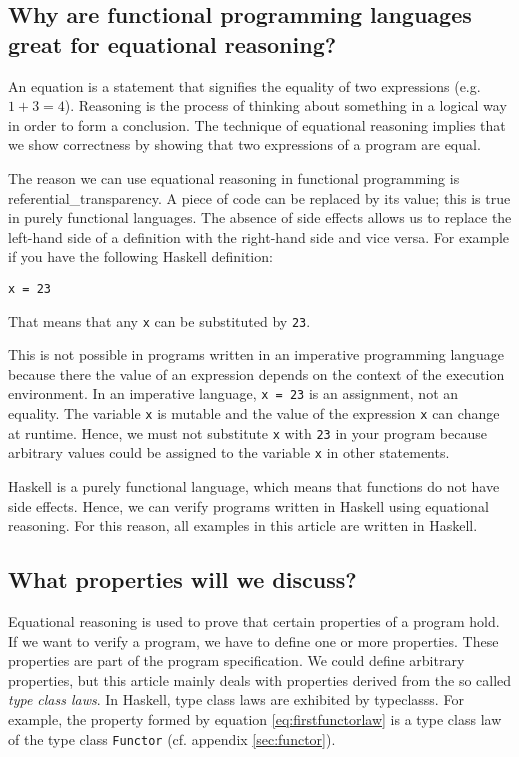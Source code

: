 \subsection{Why are functional programming languages great for equational reasoning?}

An equation is a statement that signifies the equality of two expressions (e.g. $1 + 3 = 4$). Reasoning is the process of thinking about something in a logical way in order to form a conclusion. The technique of equational reasoning implies that we show correctness by showing that two expressions of a program are equal. 

The reason we can use equational reasoning in functional programming is \gls{referential_transparency}. A piece of code can be replaced by its value; this is true in purely functional languages. The absence of side effects allows us to replace the left-hand side of a definition with the right-hand side and vice versa. For example if you have the following Haskell definition:
\begin{verbatim}
x = 23
\end{verbatim}
That means that any \verb|x| can be substituted by \verb|23|.

This is not possible in programs written in an imperative programming language because there the value of an expression depends on the context of the execution environment. In an imperative language, \verb|x = 23| is an assignment, not an equality. The variable \verb|x| is mutable and the value of the expression \verb|x| can change at runtime. Hence, we must not substitute \verb|x| with \verb|23| in your program because arbitrary values could be assigned to the variable \verb|x| in other statements.

Haskell is a purely functional language, which means that functions do not have side effects. Hence, we can verify programs written in Haskell using equational reasoning. For this reason, all examples in this article are written in Haskell.

\subsection{What properties will we discuss?}

Equational reasoning is used to prove that certain properties of a program hold. If we want to verify a program, we have to define one or more properties. These properties are part of the program specification. We could define arbitrary properties, but this article mainly deals with properties derived from the so called \emph{type class laws}. In Haskell, type class laws are exhibited by \glspl{typeclass}. For example, the property formed by equation \ref{eq:firstfunctorlaw} is a type class law of the type class \verb|Functor| (cf. appendix \ref{sec:functor}).

